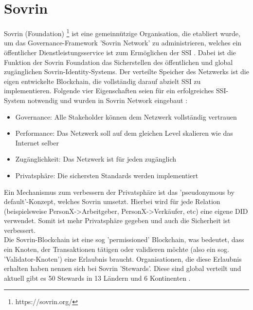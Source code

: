 \section{Sovrin}
\label{sovrin}
Sovrin (Foundation) \footnote{https://sovrin.org/} ist eine gemeinnützige Organisation, die etabliert wurde, um das Governance-Framework 'Sovrin Network' zu administrieren, welches ein öffentlicher Dienstleistungsservice ist zum Ermöglichen der SSI \cite{ID39}. Dabei ist die Funktion der Sovrin Foundation das Sicherstellen des öffentlichen und global zugänglichen Sovrin-Identity-Systems.
Der verteilte Speicher des Netzwerks ist die eigen entwickelte Blockchain, die vollständig darauf abzielt SSI zu implementieren. Folgende vier Eigenschaften seien für ein erfolgreiches SSI-System notwendig und wurden in Sovrin Network eingebaut \cite{ID40}:
\begin{itemize}
	\item Governance: Alle Stakeholder können dem Netzwerk vollständig vertrauen
	\item Performance: Das Netzwerk soll auf dem gleichen Level skalieren wie das Internet selber
	\item Zugänglichkeit: Das Netzwerk ist für jeden zugänglich
	\item Privatsphäre: Die sichersten Standards werden implementiert
\end{itemize}
Ein Mechanismus zum verbessern der Privatsphäre ist das 'pseudonymous by default'-Konzept, welches Sovrin umsetzt. Hierbei wird für jede Relation (beispielsweise PersonX->Arbeitgeber, PersonX->Verkäufer, etc) eine eigene DID verwendet. Somit ist mehr Privatsphäre gegeben und auch die Sicherheit ist verbessert. \\
Die Sovrin-Blockchain ist eine sog 'permissioned' Blockchain, was bedeutet, dass ein Knoten, der Transaktionen tätigen oder validieren möchte (also ein sog. 'Validator-Knoten') eine Erlaubnis braucht. Organisationen, die diese Erlaubnis erhalten haben nennen sich bei Sovrin 'Stewards'. Diese sind global verteilt und aktuell gibt es 50 Stewards in 13 Ländern und 6 Kontinenten \cite{ID43}. 
